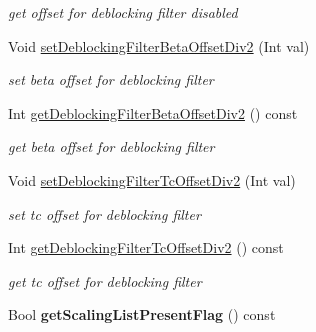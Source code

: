 \begin{DoxyCompactItemize}
\begin{DoxyCompactList}\small\item\em get offset for deblocking filter disabled \end{DoxyCompactList}\item 
\mbox{\label{class_t_com_p_p_s_aa2654a797642eab1eb93be2fbee39674}} 
Void \hyperlink{class_t_com_p_p_s_aa2654a797642eab1eb93be2fbee39674}{set\+Deblocking\+Filter\+Beta\+Offset\+Div2} (Int val)
\begin{DoxyCompactList}\small\item\em set beta offset for deblocking filter \end{DoxyCompactList}\item 
\mbox{\label{class_t_com_p_p_s_a0e4ed95a68bb6297681c4d8aaf0f061f}} 
Int \hyperlink{class_t_com_p_p_s_a0e4ed95a68bb6297681c4d8aaf0f061f}{get\+Deblocking\+Filter\+Beta\+Offset\+Div2} () const
\begin{DoxyCompactList}\small\item\em get beta offset for deblocking filter \end{DoxyCompactList}\item 
\mbox{\label{class_t_com_p_p_s_ae1d088328ab46acfcdfa75c8ffdbb3d7}} 
Void \hyperlink{class_t_com_p_p_s_ae1d088328ab46acfcdfa75c8ffdbb3d7}{set\+Deblocking\+Filter\+Tc\+Offset\+Div2} (Int val)
\begin{DoxyCompactList}\small\item\em set tc offset for deblocking filter \end{DoxyCompactList}\item 
\mbox{\label{class_t_com_p_p_s_addc0c4dd1488d169029b684900f1be01}} 
Int \hyperlink{class_t_com_p_p_s_addc0c4dd1488d169029b684900f1be01}{get\+Deblocking\+Filter\+Tc\+Offset\+Div2} () const
\begin{DoxyCompactList}\small\item\em get tc offset for deblocking filter \end{DoxyCompactList}\item 
\mbox{\label{class_t_com_p_p_s_a78c0d7a0ed550833f864c59559ee8037}} 
Bool {\bfseries get\+Scaling\+List\+Present\+Flag} () const
\item 
\mbox{\label{class_t_com_p_p_s_a1ccbb828ed62f820e4eb70c1df0f60e0}} 

\end{DoxyCompactItemize}

